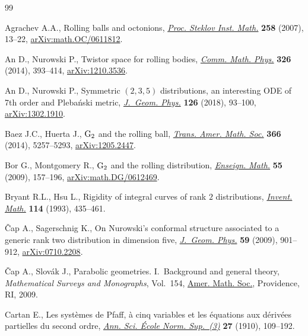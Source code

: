 \begin{thebibliography}{99}
\footnotesize\itemsep=0pt

Agrachev A.A., Rolling balls and octonions, \href{https://doi.org/10.1134/S0081543807030030}{\textit{Proc. Steklov Inst. Math.}}
 \textbf{258} (2007), 13--22, \href{https://arxiv.org/abs/math.OC/0611812}{arXiv:math.OC/0611812}.

An D., Nurowski P., Twistor space for rolling bodies, \href{https://doi.org/10.1007/s00220-013-1839-2}{\textit{Comm. Math.
 Phys.}} \textbf{326} (2014), 393--414, \href{https://arxiv.org/abs/1210.3536}{arXiv:1210.3536}.

An D., Nurowski P., Symmetric {$(2,3,5)$} distributions, an interesting {ODE}
 of 7th order and {P}leba\'{n}ski metric, \href{https://doi.org/10.1016/j.geomphys.2018.01.009}{\textit{J.~Geom. Phys.}} \textbf{126}
 (2018), 93--100, \href{https://arxiv.org/abs/1302.1910}{arXiv:1302.1910}.

Baez J.C., Huerta J., {${\rm G}_2$} and the rolling ball, \href{https://doi.org/10.1090/S0002-9947-2014-05977-1}{\textit{Trans. Amer.
 Math. Soc.}} \textbf{366} (2014), 5257--5293, \href{https://arxiv.org/abs/1205.2447}{arXiv:1205.2447}.

Bor G., Montgomery R., {${\rm G}_2$} and the rolling distribution,
 \href{https://doi.org/10.4171/LEM/55-1-8}{\textit{Enseign. Math.}} \textbf{55} (2009), 157--196,
 \href{https://arxiv.org/abs/math.DG/0612469}{arXiv:math.DG/0612469}.

Bryant R.L., Hsu L., Rigidity of integral curves of rank {$2$} distributions,
 \href{https://doi.org/10.1007/BF01232676}{\textit{Invent. Math.}} \textbf{114} (1993), 435--461.

\v{C}ap A., Sagerschnig K., On {N}urowski's conformal structure associated to a
 generic rank two distribution in dimension five, \href{https://doi.org/10.1016/j.geomphys.2009.04.001}{\textit{J.~Geom. Phys.}}
 \textbf{59} (2009), 901--912, \href{https://arxiv.org/abs/0710.2208}{arXiv:0710.2208}.

\v{C}ap A., Slov\'{a}k J., Parabolic geometries. {I}.~{B}ackground and general
 theory, \textit{Mathematical Surveys and Monographs}, Vol.~154, \href{https://doi.org/10.1090/surv/154}{Amer. Math.
 Soc.}, Providence, RI, 2009.

Cartan E., Les syst\`emes de {P}faff, \`a cinq variables et les \'{e}quations
 aux d\'{e}riv\'{e}es partielles du second ordre, \href{https://doi.org/10.24033/asens.618}{\textit{Ann. Sci. \'{E}cole
 Norm. Sup.~(3)}} \textbf{27} (1910), 109--192.


\end{thebibliography}
